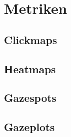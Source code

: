 %
%
%
%

\section{Metriken}


\subsection{Clickmaps}
\subsection{Heatmaps}
\subsection{Gazespots}
\subsection{Gazeplots}